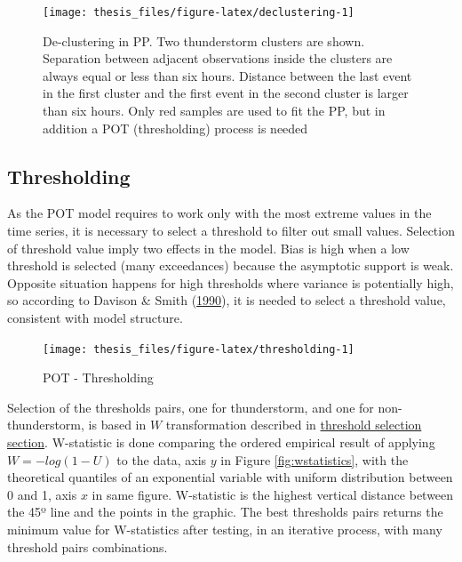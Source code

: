 \documentclass[12pt,oneside]{reedthesis}
\begin{document}
\footnotesize
\begin{figure}

{\centering \texttt{[image: thesis\_files/figure-latex/declustering-1]} 

}

\caption{De-clustering in PP. Two thunderstorm clusters are shown. Separation between adjacent observations inside the clusters are always equal or less than six hours. Distance between the last event in the first cluster and the first event in the second cluster is larger than six hours. Only red samples are used to fit the PP, but in addition a POT (thresholding) process is needed}\label{fig:declustering}
\end{figure}
\normalsize

\hypertarget{thresholding}{%
\subsection{Thresholding}\label{thresholding}}

As the POT model requires to work only with the most extreme values in the time series, it is necessary to select a threshold to filter out small values. Selection of threshold value imply two effects in the model. Bias is high when a low threshold is selected (many exceedances) because the asymptotic support is weak. Opposite situation happens for high thresholds where variance is potentially high, so according to Davison \& Smith (\protect\hyperlink{ref-Davison1990}{1990}), it is needed to select a threshold value, consistent with model structure.

\footnotesize
\begin{figure}

{\centering \texttt{[image: thesis\_files/figure-latex/thresholding-1]} 

}

\caption{POT - Thresholding}\label{fig:thresholding}
\end{figure}
\normalsize

Selection of the thresholds pairs, one for thunderstorm, and one for non-thunderstorm, is based in \(W\) transformation described in \protect\hyperlink{thresholdselection}{threshold selection section}. W-statistic is done comparing the ordered empirical result of applying \(W = -log(1-U)\) to the data, axis \(y\) in Figure \ref{fig:wstatistics}, with the theoretical quantiles of an exponential variable with uniform distribution between 0 and 1, axis \(x\) in same figure. W-statistic is the highest vertical distance between the 45º line and the points in the graphic. The best thresholds pairs returns the minimum value for W-statistics after testing, in an iterative process, with many threshold pairs combinations.
\end{document}
